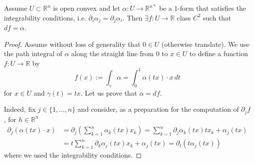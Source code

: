 \begin{lemma}\label{lem:conv-conv-dom}
	Assume $U \subset \mathbb{R}^{n}$ is open convex and let $\alpha: U \to \mathbb{R}^{n*}$ be a $1$-form that satisfies the integrability conditions, i.e. $\partial_{i} \alpha_{j} = \partial_{j} \alpha_{i}$. Then $\exists f: U \to \mathbb{R}$ class $C^{2}$ such that $df = \alpha$.
\end{lemma}
\begin{proof}


	Assume without loss of generality that $0 \in U$ (otherwise translate). We use the path integral of $\alpha$ along the straight line from $0$ to $x \in U$ to define a function $f: U \rightarrow \mathbb{R}$ by
	$$
		f(x):= \int_{\gamma } \alpha = \int_0^1 \alpha(t x) \cdot x \, dt
	$$
	for $x \in U$ and $\gamma(t) = tx$. Let us prove that $\alpha = df$.

	Indeed, fix $j \in\{1, \ldots, n\}$ and consider, as a preparation for the computation of $\partial_j f$, for $h \in \mathbb{R}^n$
	\begin{align*}
		\partial_j(\alpha(tx) \cdot x) & =\partial_j\left(\sum_{k=1}^n \alpha_k(t x) x_k\right)
		=\sum_{k=1}^n \partial_j \alpha_k(t x) t x_k+\alpha _j(t x)
		\\ &=  t\sum_{k=1}^n \partial_k \alpha _j(t x) x_k+\alpha _j(t x)
		=\partial_t\left(t \alpha _j(t x)\right)
	\end{align*}
	where we used the integrability conditions.
	

\end{proof}
